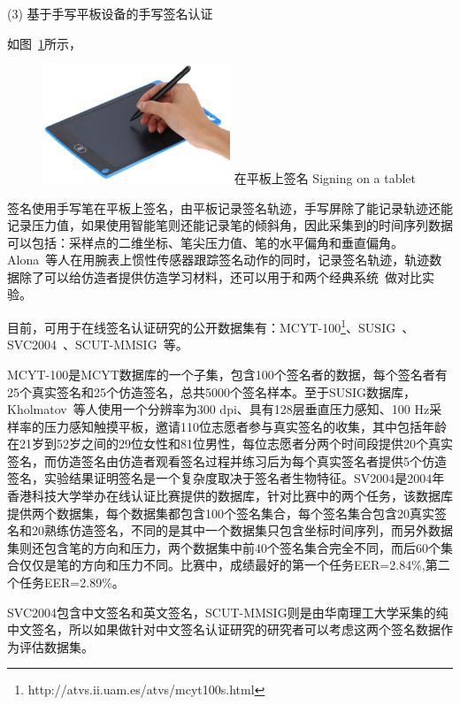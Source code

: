 (3) 基于手写平板设备的手写签名认证


如图~\ref{fig:signing-tablet}所示，
\begin{figure}[!htp]
  \centering
  \includegraphics[width=0.5\textwidth]{figure/tablet.png}
  \bicaption
    {在平板上签名}
    {Signing on a tablet}
  \label{fig:signing-tablet}
\end{figure}
签名使用手写笔在平板上签名，由平板记录签名轨迹，手写屏除了能记录轨迹还能记录压力值，如果使用智能笔则还能记录笔的倾斜角，因此采集到的时间序列数据可以包括：采样点的二维坐标、笔尖压力值、笔的水平偏角和垂直偏角。Alona~\cite{Levy2018Handwritten}等人在用腕表上惯性传感器跟踪签名动作的同时，记录签名轨迹，轨迹数据除了可以给仿造者提供仿造学习材料，还可以用于和两个经典系统~\cite{fischer2015robust,kholmatov2005identity}做对比实验。

目前，可用于在线签名认证研究的公开数据集有：MCYT-100\footnote{http://atvs.ii.uam.es/atvs/mcyt100s.html}、SUSIG~\cite{kholmatov2006sigsa}、SVC2004~\cite{10.1007/978-3-540-25948-0_3}、SCUT-MMSIG~\cite{10.1007/978-3-319-69923-3_78}等。

MCYT-100是MCYT数据库的一个子集，包含100个签名者的数据，每个签名者有25个真实签名和25个仿造签名，总共5000个签名样本。至于SUSIG数据库，Kholmatov~\cite{kholmatov2006sigsa}等人使用一个分辨率为300 dpi、具有128层垂直压力感知、100 Hz采样率的压力感知触摸平板，邀请110位志愿者参与真实签名的收集，其中包括年龄在21岁到52岁之间的29位女性和81位男性，每位志愿者分两个时间段提供20个真实签名，而仿造签名由仿造者观看签名过程并练习后为每个真实签名者提供5个仿造签名，实验结果证明签名是一个复杂度取决于签名者生物特征。SV2004是2004年香港科技大学举办在线认证比赛提供的数据库，针对比赛中的两个任务，该数据库提供两个数据集，每个数据集都包含100个签名集合，每个签名集合包含20真实签名和20熟练仿造签名，不同的是其中一个数据集只包含坐标时间序列，而另外数据集则还包含笔的方向和压力，两个数据集中前40个签名集合完全不同，而后60个集合仅仅是笔的方向和压力不同。比赛中，成绩最好的第一个任务EER=2.84\%,第二个任务EER=2.89\%。

SVC2004包含中文签名和英文签名，SCUT-MMSIG则是由华南理工大学采集的纯中文签名，所以如果做针对中文签名认证研究的研究者可以考虑这两个签名数据作为评估数据集。

